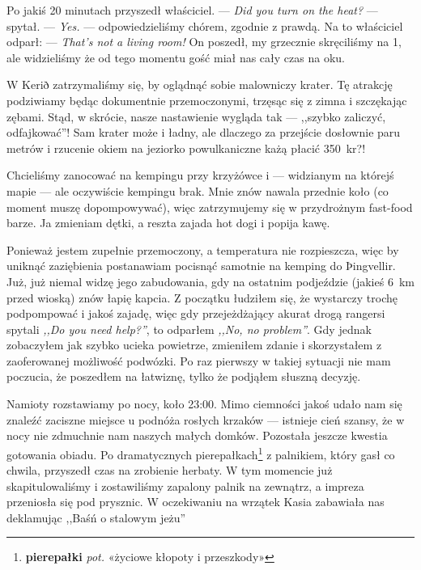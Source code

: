 \noindent Po jakiś 20 minutach przyszedł właściciel. \newline
--- \emph{Did you turn on the heat?} --- spytał. \newline
--- \emph{Yes.} --- odpowiedzieliśmy chórem, zgodnie z prawdą. \newline
Na to właściciel odparł: \newline
--- \emph{That’s not a living room!} \newline
On poszedł, my grzecznie skręciliśmy na 1, ale widzieliśmy że od tego momentu gość miał nas cały czas na oku.


W Kerið zatrzymaliśmy się, by oglądnąć sobie malowniczy krater. Tę atrakcję podziwiamy będąc dokumentnie przemoczonymi, trzęsąc się z zimna i szczękając zębami. Stąd, w skrócie, nasze nastawienie wygląda tak --- ,,szybko zaliczyć, odfajkować''! Sam krater może i ładny, ale dlaczego za przejście dosłownie paru metrów i rzucenie okiem na jeziorko powulkaniczne każą płacić 350~kr?!

Chcieliśmy zanocować na kempingu przy krzyżówce  i  --- widzianym na którejś mapie --- ale oczywiście kempingu brak. Mnie znów nawala przednie koło (co moment muszę dopompowywać), więc zatrzymujemy się w przydrożnym fast-food barze. Ja zmieniam dętki, a reszta zajada hot dogi i popija kawę.


Ponieważ jestem zupełnie przemoczony, a temperatura nie rozpieszcza, więc by uniknąć zaziębienia postanawiam pocisnąć samotnie na kemping do Þingvellir. Już, już niemal widzę jego zabudowania, gdy na ostatnim podjeździe (jakieś 6~km przed wioską) znów łapię kapcia. Z początku łudziłem się, że wystarczy trochę podpompować i jakoś zajadę, więc gdy przejeżdżający akurat drogą rangersi spytali \emph{,,Do you need help?''}, to odparłem \emph{,,No, no problem''}. Gdy jednak zobaczyłem jak szybko ucieka powietrze, zmieniłem zdanie i skorzystałem z zaoferowanej możliwość podwózki. Po raz pierwszy w takiej sytuacji nie mam poczucia, że poszedłem na łatwiznę, tylko że podjąłem słuszną decyzję.

Namioty rozstawiamy po nocy, koło 23:00. Mimo ciemności jakoś udało nam się znaleźć zaciszne miejsce u podnóża rosłych krzaków --- istnieje cień szansy, że w nocy nie zdmuchnie nam naszych małych domków. Pozostała jeszcze kwestia gotowania obiadu. Po dramatycznych pierepałkach\footnote{\textbf{pierepałki} \emph{pot.} «życiowe kłopoty i przeszkody»} z palnikiem, który gasł co chwila, przyszedł czas na zrobienie herbaty. W tym momencie już skapitulowaliśmy i zostawiliśmy zapalony palnik na zewnątrz, a impreza przeniosła się pod prysznic. W oczekiwaniu na wrzątek Kasia zabawiała nas deklamując ,,Baśń o stalowym jeżu'' \smile

